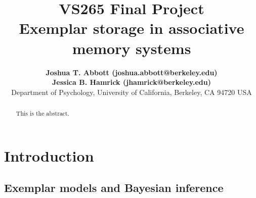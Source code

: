 \documentclass[10pt,letterpaper]{article}
\title{{\bf VS265 Final Project}\\Exemplar storage in associative memory systems}
\author{{\large \bf Joshua T. Abbott (joshua.abbott@berkeley.edu)\footnoteremember{myfootnote}{The authors contributed equally to this work.}} \\
 {\large \bf Jessica B. Hamrick (jhamrick@berkeley.edu)\footnoterecall{myfootnote}} \\
  Department of Psychology, University of California, Berkeley, CA 94720 USA}
\date{}
\begin{document}
\maketitle

\begin{abstract}
This is the abstract.

\end{abstract}

\section{Introduction}

\cite{griffiths2010probabilistic,tenenbaum2011grow}

\cite{kahneman1972subjective,gigerenzer2000simple}

\cite{marr82,anderson90}

\cite{sanborn2010rational,griffiths2012bridging}

\cite{Shi2010}

\subsection{Exemplar models and Bayesian inference}


\end{document}
